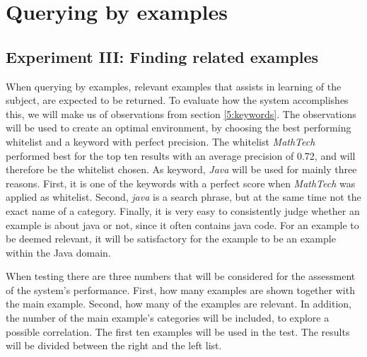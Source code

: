 \section{Querying by examples} \label{5:queryByExample}

\subsection{Experiment III: Finding related examples}

When querying by examples, relevant examples that assists in learning of the subject, are expected to be returned. To evaluate how the system accomplishes this, we will make us of observations from section \ref{5:keywords}. The observations will be used to create an optimal environment, by choosing the best performing whitelist and a keyword with perfect precision. The whitelist \textit{MathTech} performed best for the top ten results with an average precision of 0.72, and will therefore be the whitelist chosen. As keyword, \textit{Java} will be used for mainly three reasons. First, it is one of the keywords with a perfect score when \textit{MathTech} was applied as whitelist. Second, \textit{java} is a search phrase, but at the same time not the exact name of a category. Finally, it is very easy to consistently judge whether an example is about java or not, since it often contains java code. For an example to be deemed relevant, it will be satisfactory for the example to be an example within the Java domain. 

When testing there are three numbers that will be considered for the assessment of the system's performance. First, how many examples are shown together with the main example. Second, how many of the examples are relevant. In addition, the number of the main example's categories will be included, to explore a possible correlation. The first ten examples will be used in the test. The results will be divided between the right and the left list.

